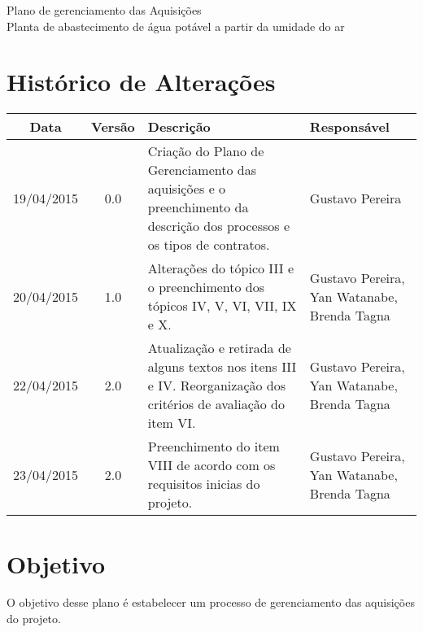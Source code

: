 

% 


\begin{center}
 {\large Plano de gerenciamento das Aquisições}\\[0.2cm]
 {Planta de abastecimento de água potável a partir da umidade do ar}\\
 \end{center}
 
 \section*{Histórico de Alterações}
\begin{table}[h]
\centering
\begin{tabular}{|c|c|p{6cm}|p{5cm}|}

Data & Versão & Descrição & Responsável\\
\hline                               
19/04/2015 & 0.0 & Criação do Plano de Gerenciamento das aquisições e o preenchimento da descrição dos processos e os tipos de contratos. & Gustavo Pereira\\
\hline
20/04/2015 & 1.0 & Alterações do tópico III e o preenchimento dos tópicos IV, V, VI, VII, IX e X. & Gustavo Pereira, Yan Watanabe, Brenda Tagna\\
\hline
22/04/2015 & 2.0 & Atualização e retirada de alguns textos nos itens III e IV. Reorganização dos critérios de avaliação do item VI. & Gustavo Pereira, Yan Watanabe, Brenda Tagna\\
\hline
23/04/2015 & 2.0 & Preenchimento do item VIII de acordo com os requisitos inicias do projeto. & Gustavo Pereira, Yan Watanabe, Brenda Tagna\\
\hline
\end{tabular}
\end{table}

\section*{Objetivo}
  O objetivo desse plano é estabelecer um processo de gerenciamento das aquisições do projeto.
  
